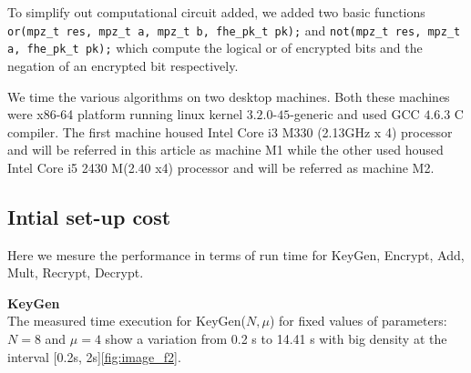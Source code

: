 \documentclass{acm_proc_article-sp}
\begin{document}
To simplify out computational circuit added, we added two basic functions \texttt{or(mpz\_t res, mpz\_t a, mpz\_t b, fhe\_pk\_t pk);} and \texttt{not(mpz\_t res, mpz\_t a, fhe\_pk\_t pk);} which compute the logical or of encrypted bits and the negation of an encrypted bit respectively.

We time the various algorithms on two desktop machines. Both these machines were x86-64 platform running linux kernel $3.2.0$-$45$-generic  and used GCC $4.6.3$ C compiler.  The first machine housed Intel Core i3 M330 (2.13GHz x 4) processor and will be referred in this article as machine M1 while the other used  housed Intel Core i5 2430 M(2.40 x4) processor and will be referred as machine M2.
 
\subsection{Intial set-up cost}
Here we mesure the performance in terms of run time for KeyGen, Encrypt, Add, Mult, Recrypt, Decrypt.\\
\begin{table}[htb]
  \centering
  \caption{Run time (ms)}
\end{table}

\textbf{KeyGen}\\
The measured time execution for KeyGen($N, \mu$)  for fixed values of parameters: $N=8$ and $\mu = 4$ show a variation from 0.2 s to 14.41 s with big density at the interval [0.2s, 2s]\autoref{fig:image_f2}.
\end{document}
